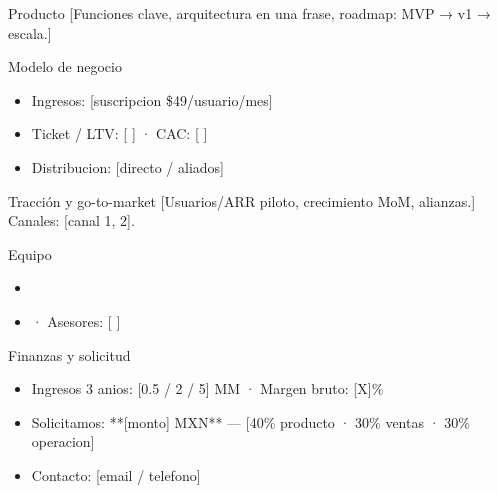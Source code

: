 \documentclass[aspectratio=169,12pt]{beamer}
\begin{document}
\begin{frame}{Producto}
  [Funciones clave, arquitectura en una frase, roadmap: MVP → v1 → escala.]
\end{frame}

\begin{frame}{Modelo de negocio}
  \begin{itemize}
    \item Ingresos: [suscripcion \$49/usuario/mes]
    \item Ticket / LTV: [ ] · CAC: [ ]
    \item Distribucion: [directo / aliados]
  \end{itemize}
\end{frame}

\begin{frame}{Tracción y go-to-market}
  [Usuarios/ARR piloto, crecimiento MoM, alianzas.] Canales: [canal 1, 2].
\end{frame}

\begin{frame}{Equipo}
  \begin{itemize}
    \item [Nombre — rol, ex-(empresa), N anios]
    \item [Nombre — rol, credencial] · Asesores: [ ]
  \end{itemize}
\end{frame}

\begin{frame}{Finanzas y solicitud}
  \begin{itemize}
    \item Ingresos 3 anios: [0.5 / 2 / 5] MM · Margen bruto: [X]\%
    \item Solicitamos: **[monto] MXN** — [40\% producto · 30\% ventas · 30\% operacion]
    \item Contacto: [email / telefono]
  \end{itemize}
\end{frame}
\end{document}
